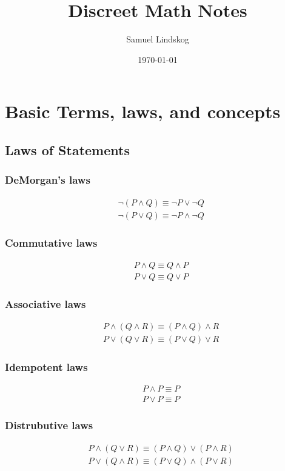 \documentclass{article}
\begin{document}
\title{Discreet Math Notes}
\author{Samuel Lindskog}
\date{\today}
\maketitle
\renewcommand{\abstractname}{}

\setcounter{secnumdepth}{2}

\section{Basic Terms, laws, and concepts}
\subsection{Laws of Statements}
\subsubsection{DeMorgan's laws}
	\begin{align*}
		&\neg(P\wedge Q)\equiv \neg P\vee \neg Q\\
		&\neg(P\vee Q)\equiv \neg P\wedge \neg Q
	\end{align*}
\subsubsection{Commutative laws}
	\begin{align*}
		&P\wedge Q\equiv Q\wedge P\\
		&P\vee Q\equiv Q\vee P
	\end{align*}
\subsubsection{Associative laws}
	\begin{align*}
		&P\wedge(Q\wedge R)\equiv (P\wedge Q)\wedge R\\
		&P\vee(Q\vee R)\equiv (P\vee Q)\vee R
	\end{align*}
\subsubsection{Idempotent laws}
	\begin{align*}
		&P\wedge P\equiv P\\
		&P\vee P\equiv P
	\end{align*}
\subsubsection{Distrubutive laws}
	\begin{align*}
		&P\wedge (Q\vee R)\equiv (P\wedge Q)\vee (P\wedge R)\\
		&P\vee (Q\wedge R)\equiv (P\vee Q)\wedge (P\vee R)
	\end{align*}
\end{document}
